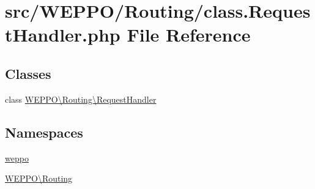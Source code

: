 \hypertarget{class_8RequestHandler_8php}{}\section{src/\+W\+E\+P\+P\+O/\+Routing/class.Request\+Handler.\+php File Reference}
\label{class_8RequestHandler_8php}
\subsection*{Classes}
\begin{DoxyCompactItemize}
\item 
class \hyperlink{classWEPPO_1_1Routing_1_1RequestHandler}{W\+E\+P\+P\+O\textbackslash{}\+Routing\textbackslash{}\+Request\+Handler}
\end{DoxyCompactItemize}
\subsection*{Namespaces}
\begin{DoxyCompactItemize}
\item 
 \hyperlink{namespaceweppo}{weppo}
\item 
 \hyperlink{namespaceWEPPO_1_1Routing}{W\+E\+P\+P\+O\textbackslash{}\+Routing}
\end{DoxyCompactItemize}
